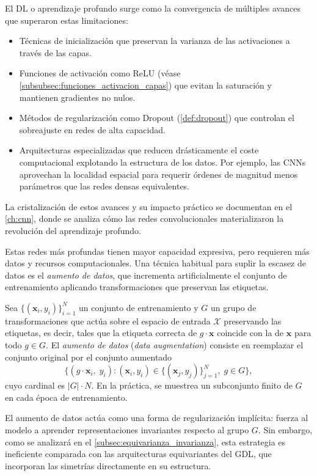 El \gls{DL} o aprendizaje profundo surge como la convergencia de múltiples avances que superaron estas limitaciones:
\begin{itemize}
	\item Técnicas de inicialización que preservan la varianza de las activaciones a través de las capas.
	\item Funciones de activación como \gls{ReLU} (véase \autoref{subsubsec:funciones_activacion_capas}) que evitan la saturación y mantienen gradientes no nulos.
	\item Métodos de regularización como Dropout (\autoref{def:dropout}) que controlan el sobreajuste en redes de alta capacidad.
	\item Arquitecturas especializadas que reducen drásticamente el coste computacional explotando la estructura de los datos. Por ejemplo, las \glspl{CNN} aprovechan la localidad espacial para requerir órdenes de magnitud menos parámetros que las redes densas equivalentes.
\end{itemize}

La cristalización de estos avances y su impacto práctico se documentan en el \autoref{ch:cnn}, donde se analiza cómo las redes convolucionales materializaron la revolución del aprendizaje profundo.

Estas redes más profundas tienen mayor capacidad expresiva, pero requieren más datos y recursos computacionales. Una técnica habitual para suplir la escasez de datos es el \textit{aumento de datos}, que incrementa artificialmente el conjunto de entrenamiento aplicando transformaciones que preservan las etiquetas.

\begin{definition}\label{def:data_augmentation}
	Sea $\{(\mathbf{x}_i, y_i)\}_{i=1}^N$ un conjunto de entrenamiento y $G$ un grupo de transformaciones que actúa sobre el espacio de entrada $\mathcal{X}$ preservando las etiquetas, es decir, tales que la etiqueta correcta de $g \cdot \mathbf{x}$ coincide con la de $\mathbf{x}$ para todo $g \in G$. El \textit{aumento de datos} (\emph{data augmentation}) consiste en reemplazar el conjunto original por el conjunto aumentado
	\[
		\{(g \cdot \mathbf{x}_i,\; y_i) : (\mathbf{x}_i, y_i) \in \{(\mathbf{x}_j, y_j)\}_{j=1}^N,\; g \in G\},
	\]
	cuyo cardinal es $|G| \cdot N$. En la práctica, se muestrea un subconjunto finito de $G$ en cada época de entrenamiento.
\end{definition}

El aumento de datos actúa como una forma de regularización implícita: fuerza al modelo a aprender representaciones invariantes respecto al grupo $G$. Sin embargo, como se analizará en el \autoref{subsec:equivarianza_invarianza}, esta estrategia es ineficiente comparada con las arquitecturas equivariantes del \gls{GDL}, que incorporan las simetrías directamente en su estructura.

